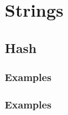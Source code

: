 \newpage
\section{Strings}

\subsection{Hash}


\subsubsection{Examples}


\subsubsection{Examples}


\newpage
